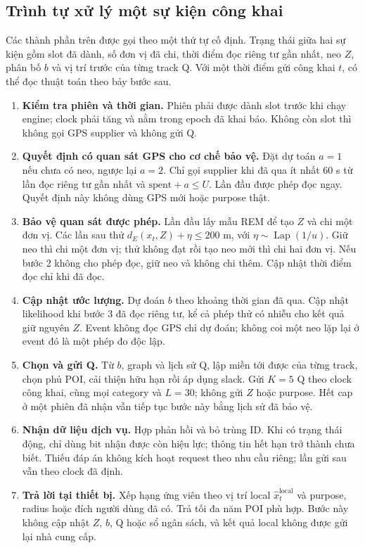 \subsection{Trình tự xử lý một sự kiện công khai}
\label{sec:current-execution-order}

Các thành phần trên được gọi theo một thứ tự cố định. Trạng thái giữa hai
sự kiện gồm slot đã dành, số đơn vị đã chi, thời điểm đọc riêng tư gần nhất,
neo $Z$, phân bố $b$ và vị trí trước của từng track Q. Với một thời điểm gửi
công khai $t$, có thể đọc thuật toán theo bảy bước sau.

\begin{enumerate}
  \item \textbf{Kiểm tra phiên và thời gian.} Phiên phải được dành slot trước
  khi chạy engine; clock phải tăng và nằm trong epoch đã khai báo. Không còn
  slot thì không gọi GPS supplier và không gửi Q.
  \item \textbf{Quyết định có quan sát GPS cho cơ chế bảo vệ.} Đặt dự toán
  $a=1$ nếu chưa có neo, ngược lại $a=2$. Chỉ gọi supplier khi đã qua ít nhất
  60 s từ lần đọc riêng tư gần nhất và $\mathrm{spent}+a\le U$. Lần đầu được
  phép đọc ngay. Quyết định này không dùng GPS mới hoặc purpose thật.
  \item \textbf{Bảo vệ quan sát được phép.} Lần đầu lấy mẫu REM để tạo $Z$ và
  chi một đơn vị. Các lần sau thử $d_E(x_t,Z)+\eta\le200$ m, với
  $\eta\sim\operatorname{Lap}(1/u)$. Giữ neo thì chi một đơn vị; thử không
  đạt rồi tạo neo mới thì chi hai đơn vị. Nếu bước 2 không cho phép đọc, giữ
  neo và không chi thêm. Cập nhật thời điểm đọc chỉ khi đã đọc.
  \item \textbf{Cập nhật ước lượng.} Dự đoán $b$ theo khoảng thời gian đã qua.
  Cập nhật likelihood khi bước 3 đã đọc riêng tư, kể cả phép thử có nhiễu
  cho kết quả giữ nguyên $Z$. Event không đọc GPS chỉ dự đoán; không coi
  một neo lặp lại ở event đó là một phép đo độc lập.
  \item \textbf{Chọn và gửi Q.} Từ $b$, graph và lịch sử Q, lập miền tới được
  của từng track, chọn phủ POI, cải thiện hữu hạn rồi áp dụng slack. Gửi
  $K=5$ Q theo clock công khai, cùng mọi category và $L=30$; không gửi $Z$
  hoặc purpose. Hết cap ở một phiên đã nhận vẫn tiếp tục bước này bằng lịch
  sử đã bảo vệ.
  \item \textbf{Nhận dữ liệu dịch vụ.} Hợp phản hồi và bỏ trùng ID. Khi có
  trạng thái động, chỉ dùng bit nhận được còn hiệu lực; thông tin hết hạn
  trở thành chưa biết. Thiếu đáp án không kích hoạt request theo nhu cầu
  riêng; lần gửi sau vẫn theo clock đã định.
  \item \textbf{Trả lời tại thiết bị.} Xếp hạng ứng viên theo vị trí local
  $\hat x_t^{\mathrm{local}}$ và purpose, radius hoặc đích người dùng đã có.
  Trả tối đa năm POI phù hợp. Bước này không cập nhật $Z$, $b$, Q hoặc sổ
  ngân sách, và kết quả local không được gửi lại nhà cung cấp.
\end{enumerate}

